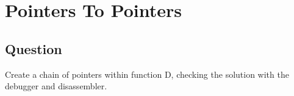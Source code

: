 \section{Pointers To Pointers}
    \subsection*{Question}
        Create a chain of pointers within function D, checking the solution
        with the debugger and disassembler.